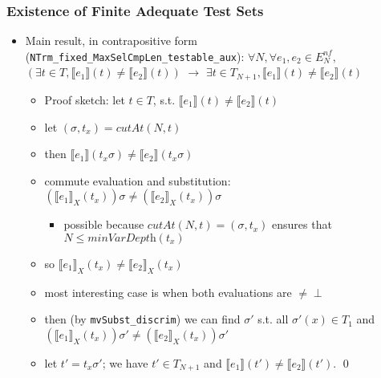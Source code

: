\documentclass{beamer}
\begin{document}
\begin{frame}
  \frametitle{Existence of Finite Adequate Test Sets}
  \begin{itemize}
    \item Main result, in contrapositive form (\texttt{NTrm\_fixed\_MaxSelCmpLen\_testable\_aux}):
      $\forall N, \forall e_1, e_2 \in E^{nf}_N,$
      $(\exists t \in T, \llbracket e_1 \rrbracket (t) \neq \llbracket e_2 \rrbracket (t))$
      $\rightarrow$
      $\exists t \in T_{N+1}, \llbracket e_1 \rrbracket (t) \neq \llbracket e_2 \rrbracket (t)$
      \pause
	  \begin{itemize}
	    \item Proof sketch: let $t \in T$, s.t. $\llbracket e_1 \rrbracket (t) \neq \llbracket e_2 \rrbracket (t)$
	    \pause
	    \item let $(\sigma, t_x) = \mathit{cutAt}(N, t)$
	    \item then $\llbracket e_1 \rrbracket (t_x \sigma) \neq \llbracket e_2 \rrbracket (t_x \sigma)$
	    \pause
	    \item commute evaluation and substitution: 
	      $(\llbracket e_1 \rrbracket_X (t_x))\sigma \neq (\llbracket e_2 \rrbracket_X (t_x)) \sigma$
	      \begin{itemize}
	        \item possible because $\mathit{cutAt}(N, t) = (\sigma, t_x)$
			  ensures that $N \le \textit{minVarDepth}(t_x)$
	      \end{itemize}  
	    \pause
	    \item so $\llbracket e_1 \rrbracket_X (t_x) \neq \llbracket e_2 \rrbracket_X (t_x)$
	    \pause
	    \item most interesting case is when both evaluations are $\neq \perp$
	    \item then (by \texttt{mvSubst\_discrim}) we can find $\sigma'$ s.t.
	      all $\sigma'(x) \in T_1$ and 
	      $(\llbracket e_1 \rrbracket_X (t_x))\sigma' \neq (\llbracket e_2 \rrbracket_X (t_x)) \sigma'$
	    \pause
	    \item let $t' = t_x \sigma'$; we have $t' \in T_{N+1}$ and 
	      $\llbracket e_1 \rrbracket (t') \neq \llbracket e_2 \rrbracket (t')$. \qed
	  \end{itemize}
  \end{itemize}
\end{frame}
\end{document}
